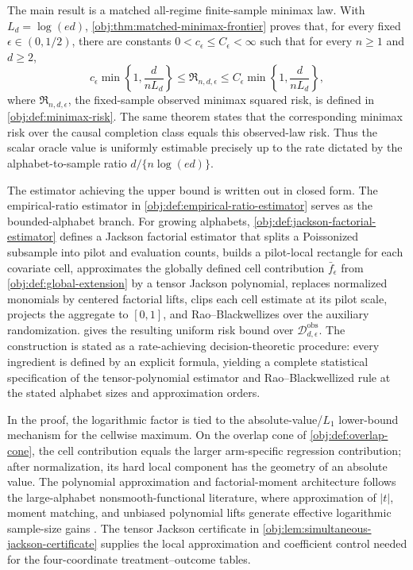 The main result is a matched all-regime finite-sample minimax law. With \(L_d=\log(ed)\), \cref{obj:thm:matched-minimax-frontier} proves that, for every fixed \(\epsilon\in(0,1/2)\), there are constants \(0<c_\epsilon\le C_\epsilon<\infty\) such that for every \(n\ge1\) and \(d\ge2\),
\[
c_\epsilon \min\left\{1,\frac{d}{nL_d}\right\}
\le
\mathfrak R_{n,d,\epsilon}
\le
C_\epsilon \min\left\{1,\frac{d}{nL_d}\right\},
\]
where \(\mathfrak R_{n,d,\epsilon}\), the fixed-sample observed minimax squared risk, is defined in \cref{obj:def:minimax-risk}. The same theorem states that the corresponding minimax risk over the causal completion class equals this observed-law risk. Thus the scalar oracle value is uniformly estimable precisely up to the rate dictated by the alphabet-to-sample ratio \(d/\{n\log(ed)\}\).

The estimator achieving the upper bound is written out in closed form. The empirical-ratio estimator in \cref{obj:def:empirical-ratio-estimator} serves as the bounded-alphabet branch. For growing alphabets, \cref{obj:def:jackson-factorial-estimator} defines a Jackson factorial estimator that splits a Poissonized subsample into pilot and evaluation counts, builds a pilot-local rectangle for each covariate cell, approximates the globally defined cell contribution \(\bar f_\epsilon\) from \cref{obj:def:global-extension} by a tensor Jackson polynomial, replaces normalized monomials by centered factorial lifts, clips each cell estimate at its pilot scale, projects the aggregate to \([0,1]\), and Rao--Blackwellizes over the auxiliary randomization.  gives the resulting uniform risk bound over \(\mathcal D_{d,\epsilon}^{\mathrm{obs}}\). The construction is stated as a rate-achieving decision-theoretic procedure: every ingredient is defined by an explicit formula, yielding a complete statistical specification of the tensor-polynomial estimator and Rao--Blackwellized rule at the stated alphabet sizes and approximation orders.

In the proof, the logarithmic factor is tied to the absolute-value/\(L_1\) lower-bound mechanism for the cellwise maximum. On the overlap cone of \cref{obj:def:overlap-cone}, the cell contribution equals the larger arm-specific regression contribution; after normalization, its hard local component has the geometry of an absolute value. The polynomial approximation and factorial-moment architecture follows the large-alphabet nonsmooth-functional literature, where approximation of \(|t|\), moment matching, and unbiased polynomial lifts generate effective logarithmic sample-size gains \citep{CaiLow2011L1,JiaoVenkatHanWeissman2015Functionals,Wu2016,HanJiaoWeissman2018Local,Valiant2017}. The tensor Jackson certificate in \cref{obj:lem:simultaneous-jackson-certificate} supplies the local approximation and coefficient control needed for the four-coordinate treatment--outcome tables.

